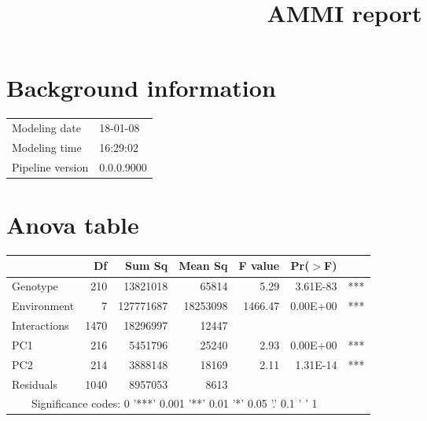 \documentclass[a4paper,11pt]{article}\usepackage[]{graphicx}\usepackage[]{color}
\title{AMMI report}%
\author{\vspace{-5ex}}
\date{\vspace{-5ex}}
\begin{document}


\maketitle
\singlespacing

\section{Background information}
\begin{table}[ht]
\begin{flushleft}
\begin{tabular}{ll}
  Modeling date & 18-01-08 \\ 
  Modeling time & 16:29:02 \\ 
  Pipeline version & 0.0.0.9000 \\ 
  \end{tabular}
\label{background}
\end{flushleft}
\end{table}


\section{Anova table}

\begin{table}[ht]
\begin{flushleft}
\begin{tabular}{lrrrrrl}
  \hline
 & Df & Sum Sq & Mean Sq & F value & Pr($>$F) &  \\ 
  \hline
Genotype & 210 & 13821018 & 65814 & 5.29 & 3.61E-83 & *** \\ 
  Environment & 7 & 127771687 & 18253098 & 1466.47 & 0.00E+00 & *** \\ 
  Interactions & 1470 & 18296997 & 12447 &  &  &  \\ 
  PC1 & 216 & 5451796 & 25240 & 2.93 & 0.00E+00 & *** \\ 
  PC2 & 214 & 3888148 & 18169 & 2.11 & 1.31E-14 & *** \\ 
  Residuals & 1040 & 8957053 & 8613 &  &  &  \\ 
   \hline  \multicolumn{6}{c}{Significance codes:  0 '***' 0.001 '**' 0.01 '*' 0.05 '.' 0.1 ' ' 1} \\ \hline
\end{tabular}
\label{anova}
\end{flushleft}
\end{table}
\end{document}
